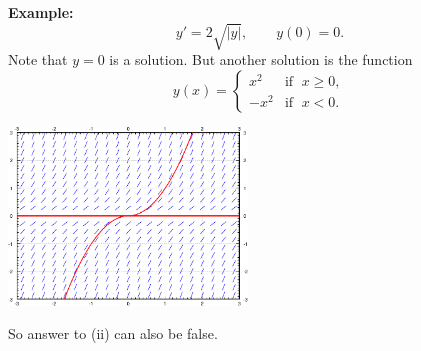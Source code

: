 \documentclass[10pt,aspectratio=169]{beamer}
\begin{document}
\begin{frame}
\textbf{Example:}
\begin{equation*}
y' = 2 \sqrt{\lvert y \rvert}, \qquad y(0) = 0 .
\end{equation*}
\pause
Note that $y=0$ is a solution.
\pause
But another solution is the function
\begin{equation*}
y(x) =
\begin{cases}
x^2 & \text{if } \; x \geq 0,\\
-x^2 & \text{if } \; x < 0.
\end{cases}
\end{equation*}

\begin{center}
\includegraphics[width=2.5in]{../figures/1-3-sqrt-sol}
\end{center}

So answer to (ii) can also be false.
\end{frame}
\end{document}

